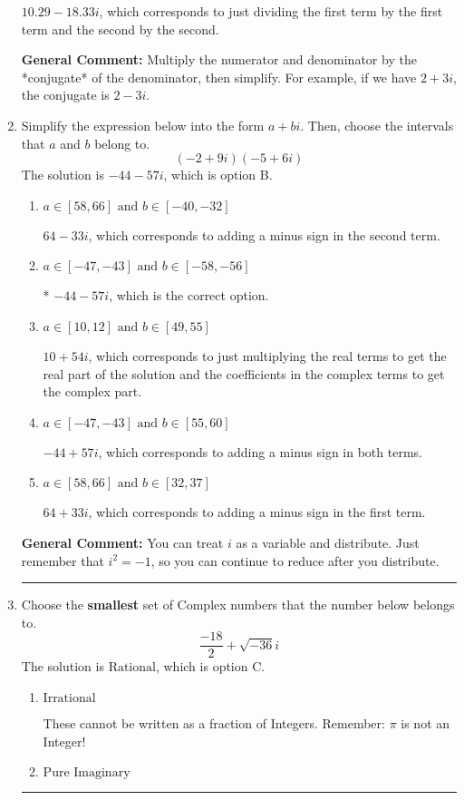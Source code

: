 \documentclass{extbook}[14pt]
\newcommand{\litem}[1]{\item #1

\rule{\textwidth}{0.4pt}}
\begin{document}
\begin{enumerate}
{\begin{enumerate}[label=\Alph*.]
 $10.29  - 18.33 i$, which corresponds to just dividing the first term by the first term and the second by the second.
\end{enumerate}

\textbf{General Comment:} Multiply the numerator and denominator by the *conjugate* of the denominator, then simplify. For example, if we have $2+3i$, the conjugate is $2-3i$.
}
\litem{
Simplify the expression below into the form $a+bi$. Then, choose the intervals that $a$ and $b$ belong to.
\[ (-2 + 9 i)(-5 + 6 i) \]The solution is \( -44 - 57 i \), which is option B.\begin{enumerate}[label=\Alph*.]
\item \( a \in [58, 66] \text{ and } b \in [-40, -32] \)

 $64 - 33 i$, which corresponds to adding a minus sign in the second term.
\item \( a \in [-47, -43] \text{ and } b \in [-58, -56] \)

* $-44 - 57 i$, which is the correct option.
\item \( a \in [10, 12] \text{ and } b \in [49, 55] \)

 $10 + 54 i$, which corresponds to just multiplying the real terms to get the real part of the solution and the coefficients in the complex terms to get the complex part.
\item \( a \in [-47, -43] \text{ and } b \in [55, 60] \)

 $-44 + 57 i$, which corresponds to adding a minus sign in both terms.
\item \( a \in [58, 66] \text{ and } b \in [32, 37] \)

 $64 + 33 i$, which corresponds to adding a minus sign in the first term.
\end{enumerate}

\textbf{General Comment:} You can treat $i$ as a variable and distribute. Just remember that $i^2=-1$, so you can continue to reduce after you distribute.
}
\litem{
Choose the \textbf{smallest} set of Complex numbers that the number below belongs to.
\[ \frac{-18}{2}+\sqrt{-36}i \]The solution is \( \text{Rational} \), which is option C.\begin{enumerate}[label=\Alph*.]
\item \( \text{Irrational} \)

These cannot be written as a fraction of Integers. Remember: $\pi$ is not an Integer!
\item \( \text{Pure Imaginary} \)


\end{enumerate}}
\end{enumerate}
\end{document}
